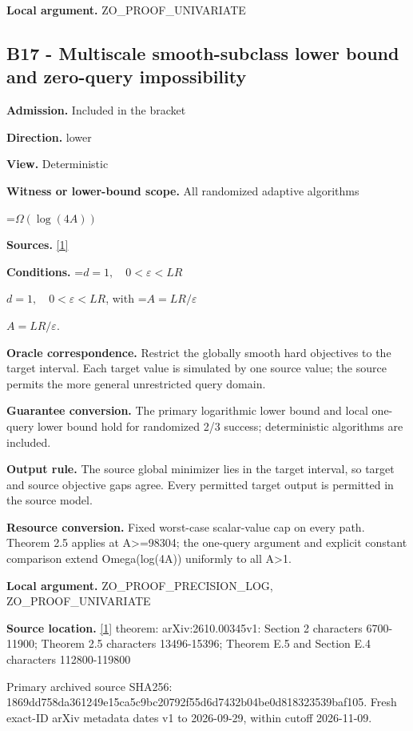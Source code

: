 \documentclass[10pt,a4paper]{article}
\newcommand{\AtlasMath}[1]{\par\begingroup\centering\setbox0=\hbox{$\displaystyle #1$}\ifdim\wd0>1.4\linewidth\typeout{ATLAS WIDE FORMULA: \the\wd0}\fi\ifdim\wd0>\linewidth\resizebox{\linewidth}{!}{\box0}\else\box0\fi\par\endgroup}
\newcommand{\AtlasInlineMath}[1]{\begingroup\setbox0=\hbox{$#1$}\ifdim\wd0>.4\linewidth\endgroup\AtlasMath{#1}\else\endgroup$#1$\fi}
\begin{document}
\textbf{Local argument.} ZO\_\allowbreak{}PROOF\_\allowbreak{}UNIVARIATE

\subsection{B17 - Multiscale smooth-subclass lower bound and zero-query impossibility}
\textbf{Admission.} Included in the bracket

\textbf{Direction.} lower

\textbf{View.} Deterministic

\textbf{Witness or lower-bound scope.} All randomized adaptive algorithms

\AtlasMath{\Omega(\log(4A))}
\textbf{Sources.} \href{https://arxiv.org/html/2610.00345v1}{[1]}

\textbf{Conditions.} \AtlasInlineMath{d=1,\quad 0<\varepsilon<LR}, with \AtlasInlineMath{A=LR/\varepsilon}.

\textbf{Oracle correspondence.} Restrict the globally smooth hard objectives to the target interval. Each target value is simulated by one source value; the source permits the more general unrestricted query domain.

\textbf{Guarantee conversion.} The primary logarithmic lower bound and local one-query lower bound hold for randomized 2/3 success; deterministic algorithms are included.

\textbf{Output rule.} The source global minimizer lies in the target interval, so target and source objective gaps agree. Every permitted target output is permitted in the source model.

\textbf{Resource conversion.} Fixed worst-case scalar-value cap on every path. Theorem 2.5 applies at A>=98304; the one-query argument and explicit constant comparison extend Omega(log(4A)) uniformly to all A>1.

\textbf{Local argument.} ZO\_\allowbreak{}PROOF\_\allowbreak{}PRECISION\_\allowbreak{}LOG, ZO\_\allowbreak{}PROOF\_\allowbreak{}UNIVARIATE

\textbf{Source location.} \href{https://arxiv.org/html/2610.00345v1}{[1]} theorem: arXiv:2610.00345v1: Section 2 characters 6700-11900; Theorem 2.5 characters 13496-15396; Theorem E.5 and Section E.4 characters 112800-119800

Primary archived source SHA256: 1869dd758da361249e15ca5c9bc20792f55d6d7432b04be0d818323539baf105. Fresh exact-ID arXiv metadata dates v1 to 2026-09-29, within cutoff 2026-11-09.
\end{document}

